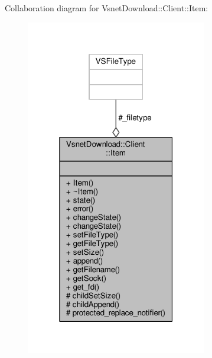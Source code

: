 Collaboration diagram for Vsnet\+Download\+:\+:Client\+:\+:Item\+:
\nopagebreak
\begin{figure}[H]
\begin{center}
\leavevmode
\includegraphics[width=223pt]{d6/dcc/classVsnetDownload_1_1Client_1_1Item__coll__graph}
\end{center}
\end{figure}
